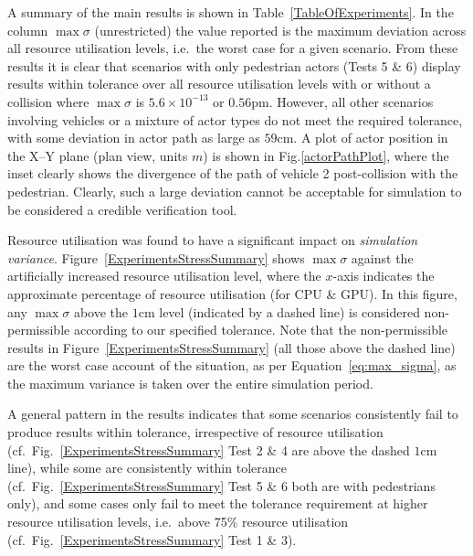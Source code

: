 A summary of the main results is shown in Table~\ref{TableOfExperiments}.  In the column $\max\sigma$ (unrestricted) the value reported is the maximum deviation across all resource utilisation levels, i.e.\ the worst case for a given scenario. From these results it is clear that scenarios with only pedestrian actors (Tests 5 \& 6) display results within tolerance over all resource utilisation levels with or without a collision where $\max\sigma$ is $5.6\times10^{-13}$ or $0.56\si{\pico\metre}$. However, all other scenarios involving vehicles or a mixture of actor types do not meet the required tolerance, with some deviation in actor path as large as $59$cm. 
%
A plot of actor position in the X--Y plane (plan view, units $m$) is shown in Fig.\ref{actorPathPlot}, where the inset clearly shows the divergence of the path of vehicle 2 post-collision with the pedestrian.
%
Clearly, such a large deviation cannot be acceptable for simulation to be considered a credible verification tool.

Resource utilisation was found to have a significant impact on \textit{simulation variance}. Figure~\ref{ExperimentsStressSummary} shows $\max\sigma$ against the artificially increased resource utilisation level, where the $x$-axis indicates the approximate percentage of resource utilisation (for CPU \& GPU). In this figure, any $\max\sigma$ above the $1$cm level (indicated by a dashed line) is considered non-permissible according to our specified tolerance. Note that the non-permissible results in Figure~\ref{ExperimentsStressSummary} (all those above the dashed line) are the worst case account of the situation, as per Equation~\ref{eq:max_sigma}, as the maximum variance is taken over the entire simulation period.

A general pattern in the results indicates that some scenarios consistently fail to produce results within tolerance, irrespective of resource utilisation (cf.\ Fig.~\ref{ExperimentsStressSummary} Test 2 \& 4 are above the dashed $1$cm line), while some are consistently within tolerance (cf.\ Fig.~\ref{ExperimentsStressSummary} Test 5 \& 6 both are with pedestrians only), and some cases only fail to meet the tolerance requirement at higher resource utilisation levels, i.e.\ above 75\% resource utilisation (cf.\ Fig.~\ref{ExperimentsStressSummary} Test 1 \& 3). 

